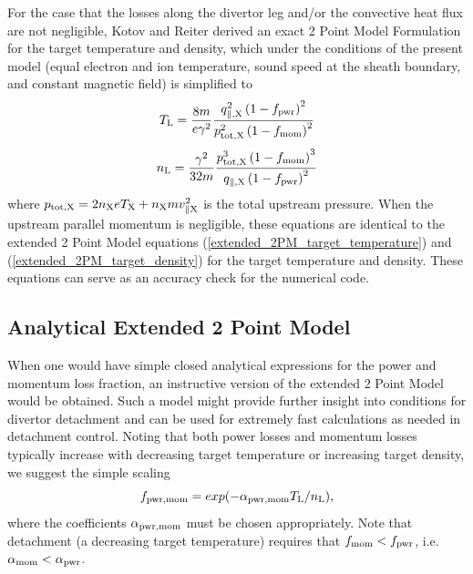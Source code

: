 \documentclass[amsmath,amssymb,a4]{revtex4-2}
\begin{document}
For the case that the losses along the divertor leg and/or the convective heat flux are not negligible, Kotov and Reiter \cite{kotov2009} derived an exact 2 Point Model Formulation for the target temperature and density, which under the conditions of the present model (equal electron and ion temperature, sound speed at the sheath boundary, and constant magnetic field) is simplified to
\begin{equation}\label{2PMF_target temperature}
    T_{\rm L} = {8m \over e \gamma^2} {q_{\parallel,\rm X}^2 \left(1-f_{\rm pwr}\right)^2 \over p_{\rm tot,X}^2 \left(1-f_{\rm mom}\right)^2}
\end{equation}
\begin{equation}\label{2PMF_target density}
    n_{\rm L} = {\gamma^2 \over 32 m} {p_{\rm tot,X}^3 \left(1-f_{\rm mom}\right)^3 \over q_{\parallel,\rm X} \left(1-f_{\rm pwr}\right)^2}
\end{equation}
where $p_{\rm tot,X} = 2 n_{\rm X} e T_{\rm X} + n_{\rm X} m v_{\parallel\rm X}^2$ is the total upstream pressure. When the upstream parallel momentum is negligible, these equations are identical to the extended 2 Point Model equations (\ref{extended_2PM_target_temperature}) and (\ref{extended_2PM_target_density}) for the target temperature and density. These equations can serve as an accuracy check for the numerical code.


\subsection{Analytical Extended 2 Point Model}
When one would have simple closed analytical expressions for the power and momentum loss fraction, an instructive version of the extended 2 Point Model would be obtained. Such a model might provide further insight into conditions for divertor detachment and can be used for extremely fast calculations as needed in detachment control. Noting that both power losses and momentum losses typically increase with decreasing target temperature or increasing target density, we suggest the simple scaling
\begin{equation}\label{scaling_of_losses}
    f_{\rm pwr, mom} = exp( - \alpha_{\rm pwr, mom} T_{\rm L} / n_{\rm L} ),
\end{equation}
where the coefficients $\alpha_{\rm pwr, mom}$ must be chosen appropriately. Note that detachment (a decreasing target temperature) requires that $f_{\rm mom} < f_{\rm pwr}$, i.e. $\alpha_{\rm mom} < \alpha_{\rm pwr}$.
\end{document}
